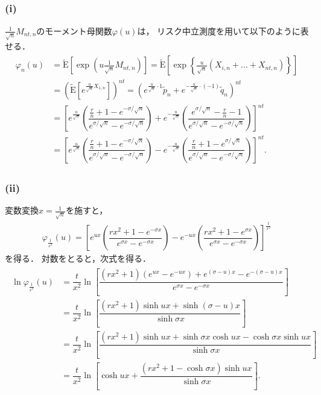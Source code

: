 \documentclass[a4paper,11pt]{jsarticle}
\newcommand{\df}[2]{\dfrac{#1}{#2}}
\newcommand{\E}{\mathrm{E}}
\newcommand{\1}{\mbox{1}\hspace{-0.30em}\mbox{1}}
\begin{document}
\subsection{} %
\subsubsection{(i)}
$\frac{1}{\sqrt{n}}M_{nt,n}$のモーメント母関数$\varphi(u)$は，
リスク中立測度を用いて以下のように表せる．
\begin{align*}
  \begin{split}
    \varphi_n(u)
    &=\tilde{\E}\left[\exp(u\frac{1}{\sqrt{n}}M_{nt,n})\right]
    =\tilde{\E}\left[\exp\left\{\frac{u}{\sqrt{n}}
    (X_{i,n}+...+X_{nt,n})\right\} \right] \\
    &=\left( \tilde{\E}\left[e^{\frac{u}{\sqrt{n}}X_{1,n}}
    \right] \right)^{nt}
    =\left( e^{\frac{u}{\sqrt{n}}\cdot 1}\tilde{p}_n
    +e^{-\frac{u}{\sqrt{n}}\cdot (-1)}\tilde{q}_n \right)^{nt}
    \\
    &=\left[ e^{\frac{u}{\sqrt{n}}}
    \left(  \df{\frac{r}{n}+1-e^{-\sigma/\sqrt{n}}}
    {e^{\sigma/\sqrt{n}}-e^{-\sigma/\sqrt{n}}}  \right)
    +e^{-\frac{u}{\sqrt{n}}}
    \left(  \df{e^{\sigma/\sqrt{n}}-\frac{r}{n}-1}
    {e^{\sigma/\sqrt{n}}-e^{-\sigma/\sqrt{n}}}  \right)
    \right]^{nt} \\
    &=\left[ e^{\frac{u}{\sqrt{n}}}
    \left(  \df{\frac{r}{n}+1-e^{-\sigma/\sqrt{n}}}
    {e^{\sigma/\sqrt{n}}-e^{-\sigma/\sqrt{n}}}  \right)
    -e^{-\frac{u}{\sqrt{n}}}
    \left(  \df{\frac{r}{n}+1-e^{\sigma/\sqrt{n}}}
    {e^{\sigma/\sqrt{n}}-e^{-\sigma/\sqrt{n}}}  \right)
    \right]^{nt}.
  \end{split}
\end{align*}

\subsubsection{(ii)}
変数変換$x=\frac{1}{\sqrt{n}}$を施すと，
\begin{align*}
  \varphi_{\frac{1}{x^2}}(u)
  =\left[ e^{ux}
  \left(  \df{rx^2+1-e^{-\sigma x}}
  {e^{\sigma x}-e^{-\sigma x}}  \right)
  -e^{-ux}
  \left(  \df{rx^2+1-e^{\sigma x}}
  {e^{\sigma x}-e^{-\sigma x}}  \right)
  \right]^{\frac{t}{x^2}}
\end{align*}
を得る．
対数をとると，次式を得る．
\begin{align*}
  \begin{split}
    \ln\varphi_{\frac{1}{x^2}}(u)
    &=\df{t}{x^2}\ln\left[\df {(rx^2+1)(e^{ux}-e^{-ux})
    +e^{(\sigma-u)x}-e^{-(\sigma-u)x}}
    {e^{\sigma x}-e^{-\sigma x}} \right] \\
    &=\df{t}{x^2}\ln\left[
    \df {(rx^2+1) \sinh{ux} +\sinh{(\sigma-u)x}}
    {\sinh{\sigma x}} \right] \\
    &=\df{t}{x^2}\ln\left[
    \df {(rx^2+1) \sinh{ux}
    + \sinh{\sigma x}\cosh{ux} - \cosh{\sigma x}\sinh{ux} }
    {\sinh{\sigma x}} \right] \\
    &=\df{t}{x^2}\ln\left[ \cosh{ux}
    +\df{(rx^2+1-\cosh{\sigma x}) \sinh{ux}}
    {\sinh{\sigma x}} \right].
  \end{split}
\end{align*}
\end{document}
